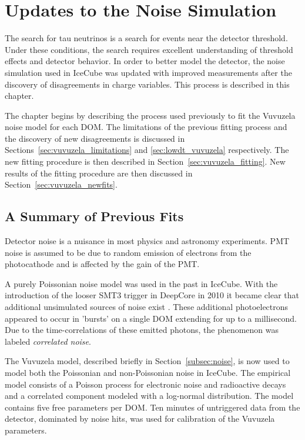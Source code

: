 \graphicspath{{chapters/vuvuzela/images/}}
\chapter{Updates to the Noise Simulation}
\label{chapter:vuvuzela}
The search for tau neutrinos is a search for events near the detector threshold.
Under these conditions, the search requires excellent understanding of threshold effects and detector behavior.
In order to better model the detector, the noise simulation used in IceCube was updated with improved measurements after the discovery of disagreements in charge variables.
This process is described in this chapter.

The chapter begins by describing the process used previously to fit the Vuvuzela noise model for each DOM.
The limitations of the previous fitting process and the discovery of new disagreements is discussed in Sections~\ref{sec:vuvuzela_limitations} and \ref{sec:lowdt_vuvuzela} respectively.
The new fitting procedure is then described in Section~\ref{sec:vuvuzela_fitting}.
New results of the fitting procedure are then discussed in Section~\ref{sec:vuvuzela_newfits}.

\section{A Summary of Previous Fits}
\label{sec:old_vuvuzela}
Detector noise is a nuisance in most physics and astronomy experiments.
PMT noise is assumed to be due to random emission of electrons from the photocathode and is affected by the gain of the PMT.

A purely Poissonian noise model was used in the past in IceCube. 
With the introduction of the looser SMT3 trigger in DeepCore in 2010 it became clear that additional unsimulated sources of noise exist \cite{Thesis-Vuvuzela}.
These additional photoelectrons appeared to occur in 'bursts' on a single DOM extending for up to a millisecond.
Due to the time-correlations of these emitted photons, the phenomenon was labeled \emph{correlated noise}.

The Vuvuzela model, described briefly in Section~\ref{subsec:noise}, is now used to model both the Poissonian and non-Poissonian noise in IceCube.
The empirical model consists of a Poisson process for electronic noise and radioactive decays and a correlated component modeled with a log-normal distribution.
The model contains five free parameters per DOM.
Ten minutes of untriggered data from the detector, dominated by noise hits, was used for calibration of the Vuvuzela parameters.

